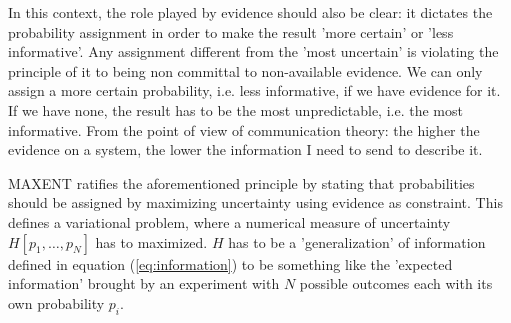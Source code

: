 \documentclass[twocolumn,showpacs,preprintnumbers,nofootinbib,prd,
superscriptaddress,10pt]{revtex4-1}
\begin{document}
In this context, the role played by evidence should also be clear: it dictates the probability assignment in order to make the result 'more certain' or 'less informative'. Any assignment different from the 'most uncertain' is violating the principle of it to being non committal to non-available evidence. We can only assign a more certain probability, i.e. less informative, if we have evidence for it. If we have none, the result has to be the most unpredictable, i.e. the most informative. From the point of view of communication theory: the higher the evidence on a system, the lower the information I need to send to describe it.
\par
MAXENT ratifies the aforementioned principle by stating that probabilities should be assigned by maximizing uncertainty using evidence as constraint. 
This defines a variational problem, where a numerical measure of uncertainty $H\left[p_1, \dots, p_N\right]$ has to maximized. $H$ has to be a 'generalization' of information defined in equation (\ref{eq:information}) to be something like the 'expected information' brought by an experiment with $N$ possible outcomes each with its own probability $p_i$.
%
%
\end{document}
